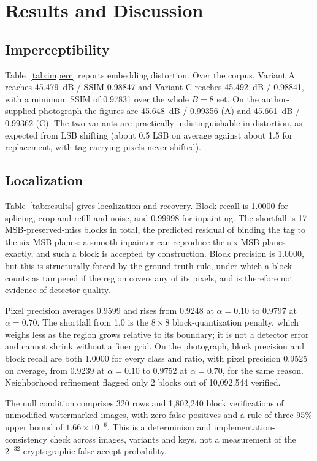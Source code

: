 \section{Results and Discussion}
\label{sec:results}

\subsection{Imperceptibility}
Table~\ref{tab:imperc} reports embedding distortion. Over the corpus, Variant A reaches 45.479~dB / SSIM 0.98847 and Variant C reaches 45.492~dB / 0.98841, with a minimum SSIM of 0.97831 over the whole $B=8$ set. On the author-supplied photograph the figures are 45.648~dB / 0.99356 (A) and 45.661~dB / 0.99362 (C). The two variants are practically indistinguishable in distortion, as expected from LSB shifting (about 0.5 LSB on average against about 1.5 for replacement, with tag-carrying pixels never shifted).

\subsection{Localization}
Table~\ref{tab:results} gives localization and recovery. Block recall is 1.0000 for splicing, crop-and-refill and noise, and 0.99998 for inpainting. The shortfall is 17 MSB-preserved-miss blocks in total, the predicted residual of binding the tag to the six MSB planes: a smooth inpainter can reproduce the six MSB planes exactly, and such a block is accepted by construction. Block precision is 1.0000, but this is structurally forced by the ground-truth rule, under which a block counts as tampered if the region covers any of its pixels, and is therefore not evidence of detector quality.

Pixel precision averages 0.9599 and rises from 0.9248 at $\alpha=0.10$ to 0.9797 at $\alpha=0.70$. The shortfall from 1.0 is the $8\times8$ block-quantization penalty, which weighs less as the region grows relative to its boundary; it is not a detector error and cannot shrink without a finer grid. On the photograph, block precision and block recall are both 1.0000 for every class and ratio, with pixel precision 0.9525 on average, from 0.9239 at $\alpha=0.10$ to 0.9752 at $\alpha=0.70$, for the same reason. Neighborhood refinement flagged only 2 blocks out of 10,092,544 verified.

The null condition comprises 320 rows and 1,802,240 block verifications of unmodified watermarked images, with zero false positives and a rule-of-three 95\% upper bound of $1.66\times10^{-6}$. This is a determinism and implementation-consistency check across images, variants and keys, not a measurement of the $2^{-32}$ cryptographic false-accept probability.

